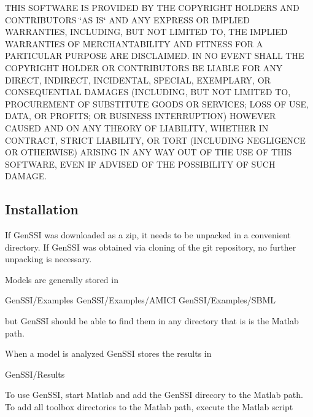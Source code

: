 T\+H\+IS S\+O\+F\+T\+W\+A\+RE IS P\+R\+O\+V\+I\+D\+ED BY T\+HE C\+O\+P\+Y\+R\+I\+G\+HT H\+O\+L\+D\+E\+RS A\+ND C\+O\+N\+T\+R\+I\+B\+U\+T\+O\+RS \char`\"{}\+A\+S I\+S\char`\"{} A\+ND A\+NY E\+X\+P\+R\+E\+SS OR I\+M\+P\+L\+I\+ED W\+A\+R\+R\+A\+N\+T\+I\+ES, I\+N\+C\+L\+U\+D\+I\+NG, B\+UT N\+OT L\+I\+M\+I\+T\+ED TO, T\+HE I\+M\+P\+L\+I\+ED W\+A\+R\+R\+A\+N\+T\+I\+ES OF M\+E\+R\+C\+H\+A\+N\+T\+A\+B\+I\+L\+I\+TY A\+ND F\+I\+T\+N\+E\+SS F\+OR A P\+A\+R\+T\+I\+C\+U\+L\+AR P\+U\+R\+P\+O\+SE A\+RE D\+I\+S\+C\+L\+A\+I\+M\+ED. IN NO E\+V\+E\+NT S\+H\+A\+LL T\+HE C\+O\+P\+Y\+R\+I\+G\+HT H\+O\+L\+D\+ER OR C\+O\+N\+T\+R\+I\+B\+U\+T\+O\+RS BE L\+I\+A\+B\+LE F\+OR A\+NY D\+I\+R\+E\+CT, I\+N\+D\+I\+R\+E\+CT, I\+N\+C\+I\+D\+E\+N\+T\+AL, S\+P\+E\+C\+I\+AL, E\+X\+E\+M\+P\+L\+A\+RY, OR C\+O\+N\+S\+E\+Q\+U\+E\+N\+T\+I\+AL D\+A\+M\+A\+G\+ES (I\+N\+C\+L\+U\+D\+I\+NG, B\+UT N\+OT L\+I\+M\+I\+T\+ED TO, P\+R\+O\+C\+U\+R\+E\+M\+E\+NT OF S\+U\+B\+S\+T\+I\+T\+U\+TE G\+O\+O\+DS OR S\+E\+R\+V\+I\+C\+ES; L\+O\+SS OF U\+SE, D\+A\+TA, OR P\+R\+O\+F\+I\+TS; OR B\+U\+S\+I\+N\+E\+SS I\+N\+T\+E\+R\+R\+U\+P\+T\+I\+ON) H\+O\+W\+E\+V\+ER C\+A\+U\+S\+ED A\+ND ON A\+NY T\+H\+E\+O\+RY OF L\+I\+A\+B\+I\+L\+I\+TY, W\+H\+E\+T\+H\+ER IN C\+O\+N\+T\+R\+A\+CT, S\+T\+R\+I\+CT L\+I\+A\+B\+I\+L\+I\+TY, OR T\+O\+RT (I\+N\+C\+L\+U\+D\+I\+NG N\+E\+G\+L\+I\+G\+E\+N\+CE OR O\+T\+H\+E\+R\+W\+I\+SE) A\+R\+I\+S\+I\+NG IN A\+NY W\+AY O\+UT OF T\+HE U\+SE OF T\+H\+IS S\+O\+F\+T\+W\+A\+RE, E\+V\+EN IF A\+D\+V\+I\+S\+ED OF T\+HE P\+O\+S\+S\+I\+B\+I\+L\+I\+TY OF S\+U\+CH D\+A\+M\+A\+GE.\hypertarget{index_install}{}\subsection{Installation}\label{index_install}
If Gen\+S\+SI was downloaded as a zip, it needs to be unpacked in a convenient directory. If Gen\+S\+SI was obtained via cloning of the git repository, no further unpacking is necessary.

Models are generally stored in 
\begin{DoxyCode}
GenSSI/Examples
GenSSI/Examples/AMICI
GenSSI/Examples/SBML
\end{DoxyCode}
 but Gen\+S\+SI should be able to find them in any directory that is is the Matlab path.

When a model is analyzed Gen\+S\+SI stores the results in 
\begin{DoxyCode}
GenSSI/Results 
\end{DoxyCode}


To use Gen\+S\+SI, start Matlab and add the Gen\+S\+SI direcory to the Matlab path. To add all toolbox directories to the Matlab path, execute the Matlab script


